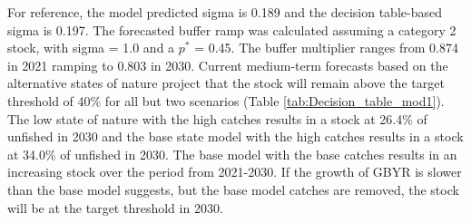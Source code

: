 \documentclass[12pt,]{article}
\begin{document}
For reference, the model predicted sigma is 0.189 and the decision
table-based sigma is 0.197. The forecasted buffer ramp was calculated
assuming a category 2 stock, with sigma = 1.0 and a \(p^*\) = 0.45. The
buffer multiplier ranges from 0.874 in 2021 ramping to 0.803 in 2030.
Current medium-term forecasts based on the alternative states of nature
project that the stock will remain above the target threshold of 40\%
for all but two scenarios (Table \ref{tab:Decision_table_mod1}). The low
state of nature with the high catches results in a stock at 26.4\% of
unfished in 2030 and the base state model with the high catches results
in a stock at 34.0\% of unfished in 2030. The base model with the base
catches results in an increasing stock over the period from 2021-2030.
If the growth of GBYR is slower than the base model suggests, but the
base model catches are removed, the stock will be at the target
threshold in 2030.
\end{document}
